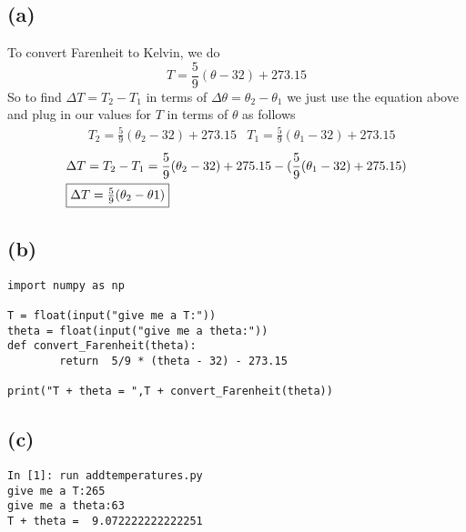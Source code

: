 \subsection*{(a)}
To convert Farenheit to Kelvin, we do
\begin{equation}
T = \frac{5}{9}(\theta - 32) + 273.15
\end{equation}
So to find $\Delta T = T_{2} - T_{1}$ in terms of $\Delta\theta = \theta_{2} - \theta_{1}$ we just use the equation above and plug in our values for $T$ in terms of $\theta$ as follows
\begin{align} 
&T_{2} = \frac{5}{9}(\theta_{2} - 32) + 273.15
&T_{1} = \frac{5}{9}(\theta_{1} - 32) + 273.15
\end{align}
\begin{align}
&\Delta T = T_{2} - T_{1} = \frac{5}{9}(\theta_{2} - 32) + 275.15 - (\frac{5}{9}(\theta_{1} - 32) + 275.15)\\
&\fbox{$\Delta T = \frac{5}{9}(\theta_{2} - \theta{1})$}
\end{align} 
\subsection*{(b)}
\begin{verbatim}
import numpy as np

T = float(input("give me a T:"))
theta = float(input("give me a theta:"))
def convert_Farenheit(theta):
        return  5/9 * (theta - 32) - 273.15

print("T + theta = ",T + convert_Farenheit(theta))
\end{verbatim}
\subsection*{(c)}
\begin{verbatim}
In [1]: run addtemperatures.py
give me a T:265
give me a theta:63
T + theta =  9.072222222222251
\end{verbatim}


